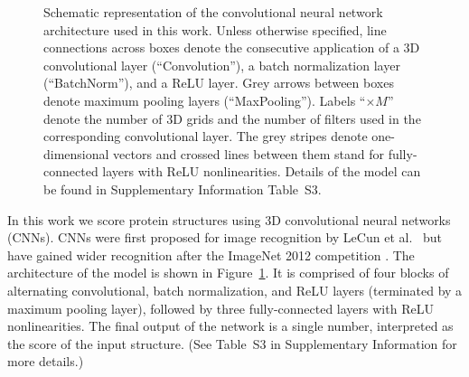 \documentclass{bioinfo}
\begin{document}
\begin{figure}[t]
    \centerline{}
%
    \caption{Schematic representation of the convolutional neural
    network architecture used in this work. Unless otherwise specified, line connections across
    boxes denote the consecutive application of a 3D convolutional
    layer (``Convolution''), a batch normalization layer
    (``BatchNorm''), and a ReLU layer. Grey arrows between boxes denote
    maximum pooling layers (``MaxPooling''). Labels ``$\times M$''
    denote the number of 3D grids and the number of filters used in the corresponding
    convolutional layer.
    The grey stripes denote
    one-dimensional vectors and crossed lines between them stand for
    fully-connected layers with ReLU nonlinearities. Details of the
    model can be found in Supplementary Information Table~S3.}
    \label{Fig:CNNModel}
\end{figure}

In this work we score protein structures using 3D convolutional neural
networks (CNNs). CNNs were first proposed for image recognition by
LeCun et al.\ \citep{lecun1989backpropagation} but have gained wider
recognition after the ImageNet 2012 competition
\citep{krizhevsky2012imagenet}. The architecture of the model is shown
in Figure~\ref{Fig:CNNModel}.  It is comprised of four blocks of
alternating convolutional, batch normalization, and ReLU layers
(terminated by a maximum pooling layer), followed by three
fully-connected layers with ReLU nonlinearities. The final output of
the network is a single number, interpreted as the score of the input
structure. (See Table~S3 in Supplementary Information for more
details.)
\end{document}
